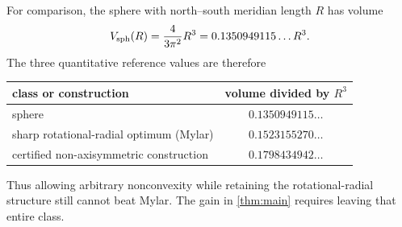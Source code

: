 For comparison, the sphere with north--south meridian length $R$ has volume
\[
V_{\rm sph}(R)=\frac{4}{3\pi^2}R^3
=0.1350949115\ldots R^3.
\]
The three quantitative reference values are therefore
\begin{center}
\begin{tabular}{@{}lc@{}}
\toprule
class or construction & volume divided by $R^3$\\
\midrule
sphere & $0.1350949115\ldots$\\
sharp rotational-radial optimum (Mylar) & $0.1523155270\ldots$\\
certified non-axisymmetric construction & $0.1798434942\ldots$\\
\bottomrule
\end{tabular}
\end{center}
Thus allowing arbitrary nonconvexity while retaining the rotational-radial structure still cannot beat Mylar.  The gain in \cref{thm:main} requires leaving that entire class.

